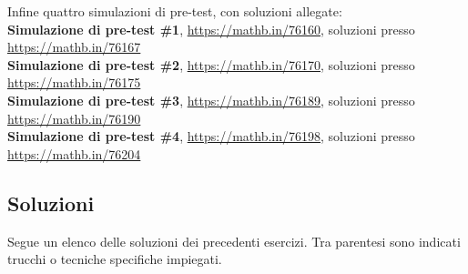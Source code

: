 \documentclass[a4paper,twoside]{article}
\theoremstyle{definition}
\numberwithin{theorem}{section}
\begin{document}
Infine quattro simulazioni di pre-test, con soluzioni allegate:\\

\textbf{Simulazione di pre-test \#1}, \url{https://mathb.in/76160}, soluzioni presso \url{https://mathb.in/76167}\\
\textbf{Simulazione di pre-test \#2}, \url{https://mathb.in/76170}, soluzioni presso \url{https://mathb.in/76175}\\
\textbf{Simulazione di pre-test \#3}, \url{https://mathb.in/76189}, soluzioni presso \url{https://mathb.in/76190}\\
\textbf{Simulazione di pre-test \#4}, \url{https://mathb.in/76198}, soluzioni presso \url{https://mathb.in/76204}\\

\newpage

\subsection{Soluzioni}
Segue un elenco delle soluzioni dei precedenti esercizi. Tra parentesi sono indicati trucchi o tecniche specifiche impiegati.\\
\end{document}
